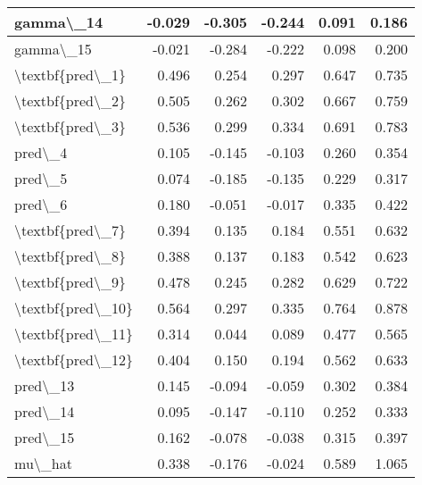 \documentclass[
  11pt,
  letterpaper,
  DIV=11,
  numbers=noendperiod]{scrartcl}
\begin{document}
\begin{table}
\begin{tabular}[t]{l|r|r|r|r|r}
\hline
gamma\textbackslash{}\_14 & -0.029 & -0.305 & -0.244 & 0.091 & 0.186\\
\hline
gamma\textbackslash{}\_15 & -0.021 & -0.284 & -0.222 & 0.098 & 0.200\\
\hline
\textbackslash{}textbf\{pred\textbackslash{}\_1\} & 0.496 & 0.254 & 0.297 & 0.647 & 0.735\\
\hline
\textbackslash{}textbf\{pred\textbackslash{}\_2\} & 0.505 & 0.262 & 0.302 & 0.667 & 0.759\\
\hline
\textbackslash{}textbf\{pred\textbackslash{}\_3\} & 0.536 & 0.299 & 0.334 & 0.691 & 0.783\\
\hline
pred\textbackslash{}\_4 & 0.105 & -0.145 & -0.103 & 0.260 & 0.354\\
\hline
pred\textbackslash{}\_5 & 0.074 & -0.185 & -0.135 & 0.229 & 0.317\\
\hline
pred\textbackslash{}\_6 & 0.180 & -0.051 & -0.017 & 0.335 & 0.422\\
\hline
\textbackslash{}textbf\{pred\textbackslash{}\_7\} & 0.394 & 0.135 & 0.184 & 0.551 & 0.632\\
\hline
\textbackslash{}textbf\{pred\textbackslash{}\_8\} & 0.388 & 0.137 & 0.183 & 0.542 & 0.623\\
\hline
\textbackslash{}textbf\{pred\textbackslash{}\_9\} & 0.478 & 0.245 & 0.282 & 0.629 & 0.722\\
\hline
\textbackslash{}textbf\{pred\textbackslash{}\_10\} & 0.564 & 0.297 & 0.335 & 0.764 & 0.878\\
\hline
\textbackslash{}textbf\{pred\textbackslash{}\_11\} & 0.314 & 0.044 & 0.089 & 0.477 & 0.565\\
\hline
\textbackslash{}textbf\{pred\textbackslash{}\_12\} & 0.404 & 0.150 & 0.194 & 0.562 & 0.633\\
\hline
pred\textbackslash{}\_13 & 0.145 & -0.094 & -0.059 & 0.302 & 0.384\\
\hline
pred\textbackslash{}\_14 & 0.095 & -0.147 & -0.110 & 0.252 & 0.333\\
\hline
pred\textbackslash{}\_15 & 0.162 & -0.078 & -0.038 & 0.315 & 0.397\\
\hline
mu\textbackslash{}\_hat & 0.338 & -0.176 & -0.024 & 0.589 & 1.065\\
\hline
\end{tabular}
\end{table}
\end{document}
